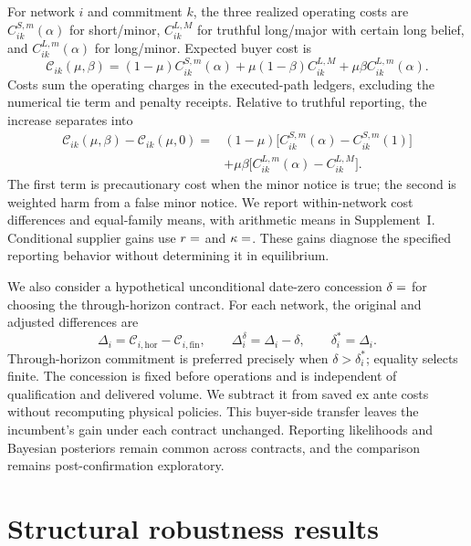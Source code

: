 \documentclass[preprint,11pt,authoryear]{elsarticle}
\begin{document}
For network $i$ and commitment $k$, the three realized operating costs are $C_{ik}^{S,m}(\alpha)$ for short/minor, $C_{ik}^{L,M}$ for truthful long/major with certain long belief, and $C_{ik}^{L,m}(\alpha)$ for long/minor. Expected buyer cost is
\begin{equation}
 \mathcal C_{ik}(\mu,\beta)=(1-\mu)C_{ik}^{S,m}(\alpha)
 +\mu(1-\beta)C_{ik}^{L,M}+\mu\beta C_{ik}^{L,m}(\alpha).
 \label{eq:exante_cost}
\end{equation}
Costs sum the operating charges in the executed-path ledgers, excluding the numerical tie term and penalty receipts. Relative to truthful reporting, the increase separates into
\begin{align}
 \mathcal C_{ik}(\mu,\beta)-\mathcal C_{ik}(\mu,0)
 ={}&(1-\mu)\big[C_{ik}^{S,m}(\alpha)-C_{ik}^{S,m}(1)\big]\nonumber\\
 &+\mu\beta\big[C_{ik}^{L,m}(\alpha)-C_{ik}^{L,M}\big].
 \label{eq:exante_split}
\end{align}
The first term is precautionary cost when the minor notice is true; the second is weighted harm from a false minor notice. We report within-network cost differences and equal-family means, with arithmetic means in Supplement~I. Conditional supplier gains use $r=\xa{r}$ and $\kappa=\xa{kappa}$. These gains diagnose the specified reporting behavior without determining it in equilibrium.


We also consider a hypothetical unconditional date-zero concession $\delta=\fd{delta}$ for choosing the through-horizon contract. For each network, the original and adjusted differences are
\begin{equation}\label{eq:fixed_discount}
 \Delta_i=\mathcal C_{i,\mathrm{hor}}-\mathcal C_{i,\mathrm{fin}},\qquad
 \Delta_i^\delta=\Delta_i-\delta,\qquad \delta_i^*=\Delta_i.
\end{equation}
Through-horizon commitment is preferred precisely when $\delta>\delta_i^*$; equality selects finite. The concession is fixed before operations and is independent of qualification and delivered volume. We subtract it from saved ex ante costs without recomputing physical policies. This buyer-side transfer leaves the incumbent's gain under each contract unchanged. Reporting likelihoods and Bayesian posteriors remain common across contracts, and the comparison remains post-confirmation exploratory.

\section{Structural robustness results}\label{sec:results}
\end{document}
